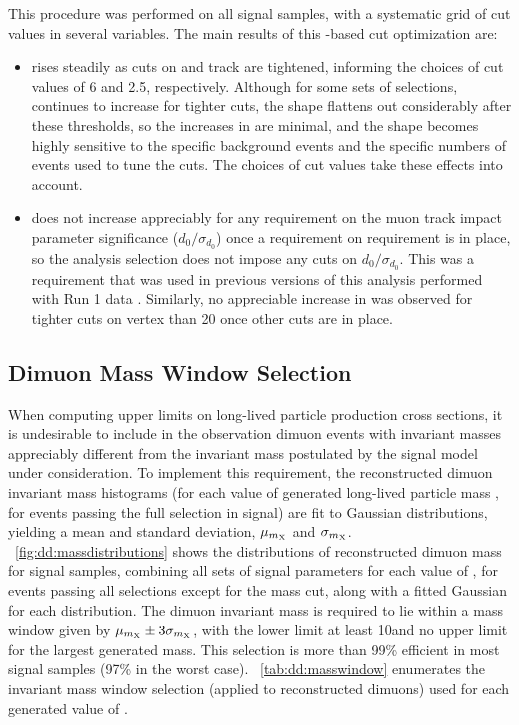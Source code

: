 This procedure was performed on all signal samples, with a systematic grid of cut values in several variables.
The main results of this \ZBi-based cut optimization are:
\begin{itemize}
  \item \ZBi rises steadily as cuts on \LxySig and track \normchisq are tightened, informing the choices of cut values of 6 and 2.5, respectively. Although for some sets of selections, \ZBi continues to increase for tighter cuts, the shape flattens out considerably after these thresholds, so the increases in \ZBi are minimal, and the shape becomes highly sensitive to the specific background events and the specific numbers of events used to tune the cuts. The choices of cut values take these effects into account.
  \item \ZBi does not increase appreciably for any requirement on the muon track impact parameter significance ($d_0/\sigma_{d_{0}}$) once a requirement on \LxySig requirement is in place, so the analysis selection does not impose any cuts on $d_0/\sigma_{d_{0}}$. This was a requirement that was used in previous versions of this analysis performed with Run 1 data \cite{EXO-12-037,CMS-PAS-EXO-14-012}. Similarly, no appreciable increase in \ZBi was observed for tighter cuts on vertex \chisq than 20 once other cuts are in place.
\end{itemize}

\subsection{Dimuon Mass Window Selection}
\label{sec:dd:cutopt_mass}
When computing upper limits on long-lived particle production cross sections, it is undesirable to include in the observation dimuon events with invariant masses appreciably different from the invariant mass postulated by the signal model under consideration.
To implement this requirement, the reconstructed dimuon invariant mass histograms (for each value of generated long-lived particle mass \mX, for events passing the full selection in \twoMu signal) are fit to Gaussian distributions, yielding a mean and standard deviation, $\mu_{m_{\mathrm{X}}}$ and $\sigma_{m_{\mathrm{X}}}$.
\Fig~\ref{fig:dd:massdistributions} shows the distributions of reconstructed dimuon mass for \twoMu signal samples, combining all sets of signal parameters for each value of \mX, for events passing all selections except for the mass cut, along with a fitted Gaussian for each distribution.
The dimuon invariant mass is required to lie within a mass window given by $\mu_{m_{\mathrm{X}}} \pm 3\sigma_{m_{\mathrm{X}}}$, with the lower limit at least 10\GeV and no upper limit for the largest generated mass.
This selection is more than 99\% efficient in most \twoMu signal samples (97\% in the worst case).
\Tab~\ref{tab:dd:masswindow} enumerates the invariant mass window selection (applied to reconstructed dimuons) used for each generated value of \mX.

